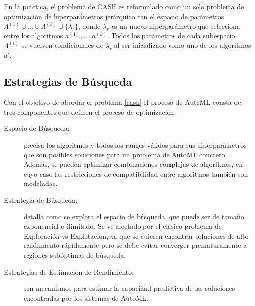 
En la práctica, el problema de CASH es reformulado como un solo problema de optimización de hiperparámetros jerárquico con el espacio de parámetros $\Lambda^{(1)}\cup ... \cup \Lambda^{(k)} \cup\{\lambda_r\}$, donde $\lambda_r$ es un nuevo hiperparámetro que selecciona entre los algoritmos $a^{(1)}, ..., a^{(k)}$. Todos los parámetros de cada subespacio $\Lambda^{(i)}$ se vuelven condicionales de $\lambda_r$ al ser inicializado como uno de los algoritmos $a^i$.
 
\subsection{Estrategias de Búsqueda}\label{subsec:automl_methods}


Con el objetivo de abordar el problema \ref{cash} el proceso de AutoML consta de tres componentes que definen el proceso de optimización:

\begin{description}
	\item[Espacio de Búsqueda:] precisa los algoritmos y todos los rangos válidos para sus hiperparámetros que son posibles soluciones para un problema de AutoML concreto. Además, se pueden optimizar combinaciones complejas de algoritmos, en cuyo caso las restricciones de compatibilidad entre algoritmos también son modeladas.
	\item[Estrategia de Búsqueda:] detalla como se explora el espacio de búsqueda, que puede ser de tamaño exponencial o ilimitado. Se ve afectado por el clásico problema de Exploración vs Explotación, ya que se quieren encontrar soluciones de alto rendimiento rápidamente pero se debe evitar converger prematuramente a regiones subóptimas de búsqueda.
	\item[Estrategias de Estimación de Rendimiento:] son mecanismos para estimar la capacidad predictiva de las soluciones encontradas por los sistemas de AutoML.
\end{description}

